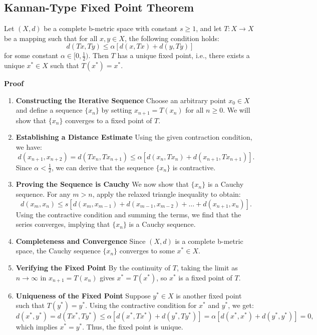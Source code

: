 \documentclass[12pt]{report}
\numberwithin{equation}{chapter}
\begin{document}
\subsection*{Kannan-Type Fixed Point Theorem}
Let $(X, d)$ be a complete b-metric space with constant $s \geq 1$, and let $T: X \to X$ be a mapping such that for all $x, y \in X$, the following condition holds:
\[
d(Tx, Ty) \leq \alpha [d(x, Tx) + d(y, Ty)]
\]
for some constant $\alpha \in [0, \frac{1}{2})$. Then $T$ has a unique fixed point, i.e., there exists a unique $x^* \in X$ such that $T(x^*) = x^*$.

\textbf{Proof}

\begin{enumerate}

\item\textbf{Constructing the Iterative Sequence}
Choose an arbitrary point $x_0 \in X$ and define a sequence $\{x_n\}$ by setting $x_{n+1} = T(x_n)$ for all $n \geq 0$. We will show that $\{x_n\}$ converges to a fixed point of $T$.

\item\textbf{Establishing a Distance Estimate}
Using the given contraction condition, we have:
\[
d(x_{n+1}, x_{n+2}) = d(Tx_n, Tx_{n+1}) \leq \alpha [d(x_n, Tx_n) + d(x_{n+1}, Tx_{n+1})].
\]
Since $\alpha < \frac{1}{2}$, we can derive that the sequence $\{x_n\}$ is contractive.

\item\textbf{Proving the Sequence is Cauchy}
We now show that $\{x_n\}$ is a Cauchy sequence. For any $m > n$, apply the relaxed triangle inequality to obtain:
\[
d(x_m, x_n) \leq s[d(x_m, x_{m-1}) + d(x_{m-1}, x_{m-2}) + \dots + d(x_{n+1}, x_n)].
\]
Using the contractive condition and summing the terms, we find that the series converges, implying that $\{x_n\}$ is a Cauchy sequence.

\item\textbf{Completeness and Convergence}
Since $(X, d)$ is a complete b-metric space, the Cauchy sequence $\{x_n\}$ converges to some $x^* \in X$.

\item\textbf{Verifying the Fixed Point}
By the continuity of $T$, taking the limit as $n \to \infty$ in $x_{n+1} = T(x_n)$ gives $x^* = T(x^*)$, so $x^*$ is a fixed point of $T$.

\item\textbf{Uniqueness of the Fixed Point}
Suppose $y^* \in X$ is another fixed point such that $T(y^*) = y^*$. Using the contractive condition for $x^*$ and $y^*$, we get:
\[
d(x^*, y^*) = d(Tx^*, Ty^*) \leq \alpha [d(x^*, Tx^*) + d(y^*, Ty^*)] = \alpha [d(x^*, x^*) + d(y^*, y^*)] = 0,
\]
which implies $x^* = y^*$. Thus, the fixed point is unique.
\end{enumerate}
\end{document}
